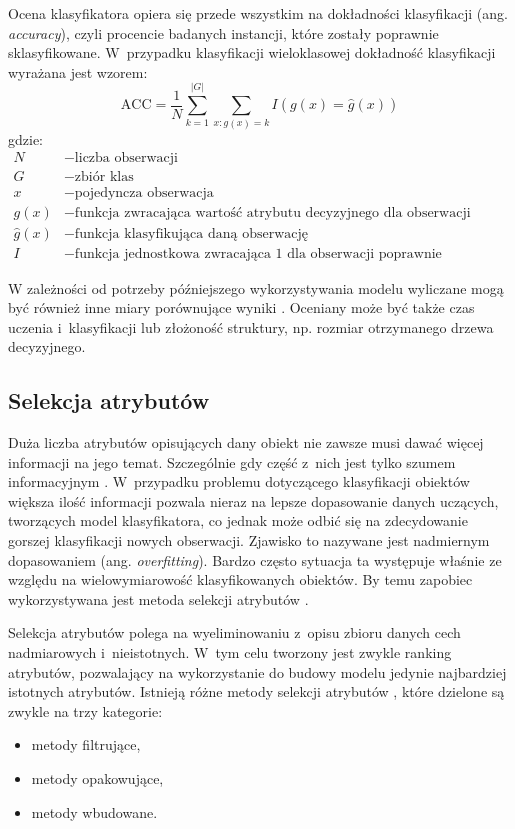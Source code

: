\documentclass[a4paper,twoside,12pt]{book}
\newcommand{\obcy}[1]{\emph{#1}}
\renewcommand{\ang}[1]{{\selectlanguage{british}\obcy{#1}}}
\begin{document}
Ocena klasyfikatora opiera się przede wszystkim na dokładności klasyfikacji (ang. \ang{accuracy}), czyli procencie badanych instancji, które zostały poprawnie sklasyfikowane. W~przypadku klasyfikacji wieloklasowej dokładność klasyfikacji wyrażana jest wzorem:
\begin{equation}
\text{ACC} = \frac{1}{N} \sum_{k=1}^{|G|} \sum_{x: g(x) = k} I \left(g(x) = \hat{g}(x)\right)
\end{equation}
gdzie:
\begin{align*}
	N &- \text{liczba obserwacji}\\
    G &- \text{zbiór klas}\\
    x &- \text{pojedyncza obserwacja}\\
    g(x) &- \text{funkcja zwracająca wartość atrybutu decyzyjnego dla obserwacji}\\
    \hat{g}(x) &- \text{funkcja klasyfikująca daną obserwację}\\
    I &- \text{funkcja jednostkowa zwracająca 1 dla obserwacji poprawnie sklasyfikowanych}
\end{align*} 

W zależności od potrzeby późniejszego wykorzystywania modelu wyliczane mogą być również inne miary porównujące wyniki \cite{bib:evaluation}. Oceniany może być także czas uczenia i~klasyfikacji lub złożoność struktury, np. rozmiar otrzymanego drzewa decyzyjnego.

\subsection{Selekcja atrybutów}

Duża liczba atrybutów opisujących dany obiekt nie zawsze musi dawać więcej informacji na jego temat. Szczególnie gdy część z~nich jest tylko szumem informacyjnym \cite{bib:szum}. W~przypadku problemu dotyczącego klasyfikacji obiektów większa ilość informacji pozwala nieraz na lepsze dopasowanie danych uczących, tworzących model klasyfikatora, co jednak może odbić się na zdecydowanie gorszej klasyfikacji nowych obserwacji. Zjawisko to nazywane jest nadmiernym dopasowaniem (ang. \ang{overfitting}). Bardzo często sytuacja ta występuje właśnie ze względu na wielowymiarowość klasyfikowanych obiektów. By temu zapobiec wykorzystywana jest metoda selekcji atrybutów \cite{bib:feature}.

Selekcja atrybutów polega na wyeliminowaniu z~opisu zbioru danych cech nadmiarowych i~nieistotnych. W~tym celu tworzony jest zwykle ranking atrybutów, pozwalający na wykorzystanie do budowy modelu jedynie najbardziej istotnych atrybutów. Istnieją różne metody selekcji atrybutów \cite{bib:metody-selekcji}, które dzielone są zwykle na trzy kategorie:
\begin{itemize}
\item metody filtrujące,
\item metody opakowujące,
\item metody wbudowane.
\end{itemize}
\end{document}
